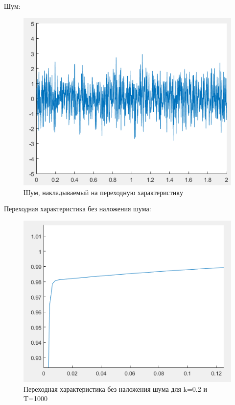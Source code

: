 \documentclass[14pt,a4paper,report]{report}
\begin{document}
Шум:

\begin{figure}[h!]
	\centering
	\includegraphics[scale = 0.56]{images/noice.png}
	\caption{Шум, накладываемый на переходную характеристику}
	\label{image:7}
\end{figure}

\clearpage

Переходная характеристика без наложения шума:

\begin{figure}[h!]
	\centering
	\includegraphics[scale = 0.70]{images/step1000.png}
	\caption{Переходная характеристика без наложения шума для k=0.2 и T=1000}
	\label{image:8}
\end{figure}
\end{document}
